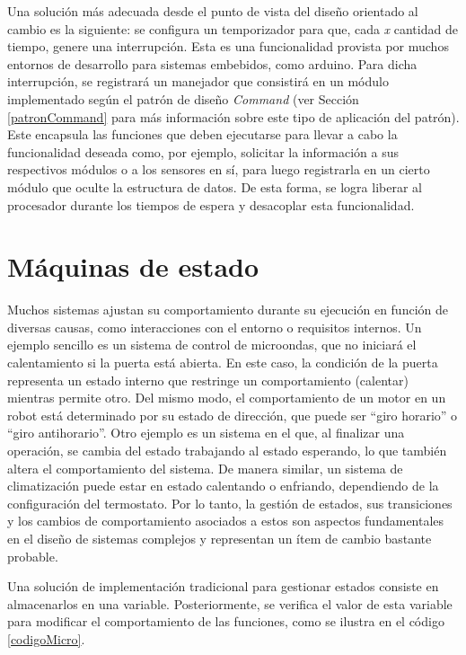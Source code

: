 Una solución más adecuada desde el punto de vista del diseño orientado al cambio es la siguiente: se configura un temporizador para que, cada \textit{x} cantidad de tiempo, genere una interrupción. Esta es una funcionalidad provista por muchos entornos de desarrollo para sistemas embebidos, como \gls{arduino}.
Para dicha interrupción, se registrará un manejador que consistirá en un módulo implementado según el patrón de diseño \textit{Command} (ver Sección \ref{patronCommand} para más información sobre este tipo de aplicación del patrón). Este encapsula las funciones que deben ejecutarse para llevar a cabo la funcionalidad deseada como, por ejemplo, solicitar la información a sus respectivos módulos \Computador o a los sensores en sí, para luego registrarla en un cierto módulo que oculte la estructura de datos. De esta forma, se logra liberar al procesador durante los tiempos de espera y desacoplar esta funcionalidad.


\section{Máquinas de estado}\label{cap:state}

Muchos sistemas ajustan su comportamiento durante su ejecución en función de diversas causas, como interacciones con el entorno o requisitos internos. Un ejemplo sencillo es un sistema de control de microondas, que no iniciará el calentamiento si la puerta está abierta. En este caso, la condición de la puerta representa un estado interno que restringe un comportamiento (calentar) mientras permite otro. Del mismo modo, el comportamiento de un motor en un robot está determinado por su estado de dirección, que puede ser ``giro horario'' o ``giro antihorario''. Otro ejemplo es un sistema en el que, al finalizar una operación, se cambia del estado trabajando al estado esperando, lo que también altera el comportamiento del sistema. De manera similar, un sistema de climatización puede estar en estado calentando o enfriando, dependiendo de la configuración del termostato. Por lo tanto, la gestión de estados, sus transiciones y los cambios de comportamiento asociados a estos son aspectos fundamentales en el diseño de sistemas complejos y representan un ítem de cambio bastante probable.

Una solución de implementación tradicional para gestionar estados consiste en almacenarlos en una variable. Posteriormente, se verifica el valor de esta variable para modificar el comportamiento de las funciones, como se ilustra en el código \ref{codigoMicro}.

